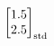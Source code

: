 \documentclass[preview]{standalone}
\begin{document}
\begin{align*}
\begin{bmatrix}1.5\\2.5\end{bmatrix}_{\rm std}
\end{align*}
\end{document}
